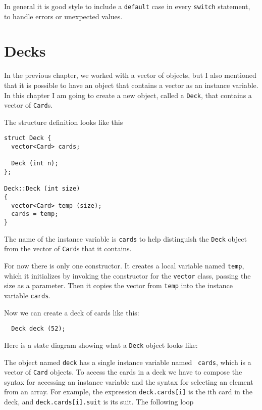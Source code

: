 
In general it is good style to include a {\tt default} case in
every {\tt switch} statement, to handle errors or unexpected values.

\section{Decks}
\label{deck}

In the previous chapter, we worked with a vector of objects,
but I also mentioned that it is possible to have an object
that contains a vector as an instance variable.  In this
chapter I am going to create a new object, called a {\tt Deck},
that contains a vector of {\tt Card}s.


The structure definition looks like this

\begin{verbatim}
struct Deck {
  vector<Card> cards;

  Deck (int n);
};

Deck::Deck (int size)
{
  vector<Card> temp (size);
  cards = temp;
}
\end{verbatim}
%
The name of the instance variable is {\tt cards} to help
distinguish the {\tt Deck} object from the vector of {\tt Card}s
that it contains.


For now there is only one constructor.  It creates a local variable
named {\tt temp}, which it initializes by invoking the constructor
for the {\tt vector} class, passing the size as a parameter.
Then it copies the vector from {\tt temp} into the instance
variable {\tt cards}.

Now we can create a deck of cards like this:

\begin{verbatim}
  Deck deck (52);
\end{verbatim}
%
Here is a state diagram showing what a
{\tt Deck} object looks like:


\vspace {0.1in}
\centerline{}
\vspace {0.1in}

The object named {\tt deck} has a single instance variable named {\tt
cards}, which is a vector of {\tt Card} objects.  To access the cards
in a deck we have to compose the syntax for accessing an
instance variable and the syntax for selecting an element from an
array.  For example, the expression {\tt deck.cards[i]} is the ith
card in the deck, and {\tt deck.cards[i].suit} is its suit.
The following loop

